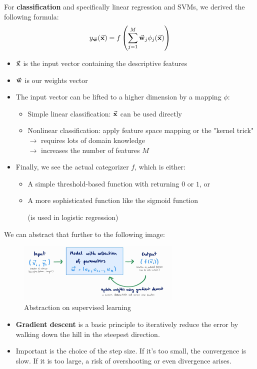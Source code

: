 For \textbf{classification} and specifically linear regression and SVMs, we derived the following formula:
\begin{align*}
  y_{\vec{\mathbf{w}}}(\vec{\mathbf{x}}) = f\left(\sum_{j=1}^M \vec{\mathbf{w}}_j\phi_j(\vec{\mathbf{x}}) \right)
\end{align*}
\begin{itemize}
  \item $\vec{\mathbf{x}}$ is the input vector containing the descriptive features
  \item $\vec{\mathbf{w}}$ is our weights vector
  \item The input vector can be lifted to a higher dimension by a mapping $\phi$:
  \begin{itemize}
    \item Simple linear classification: $\vec{\mathbf{x}}$ can be used directly
    \item Nonlinear classification: apply feature space mapping or the "kernel trick"\\$\rightarrow$ requires lots of domain knowledge\\$\rightarrow$ increases the number of features $M$
  \end{itemize}
  \item Finally, we see the actual categorizer $f$, which is either:
  \begin{itemize}
    \item A simple threshold-based function with returning $0$ or $1$, or
    \item A more sophisticated function like the sigmoid function \begin{note}(is used in logistic regression)\end{note}
  \end{itemize}
\end{itemize}

We can abstract that further to the following image:
\begin{figure}[H]
  \centering
  \includegraphics[width=0.7\textwidth]{assets/nn/in__supervised.png}
  \caption{Abstraction on supervised learning}
  \label{fig:6_intro_supervised}
\end{figure}
\begin{itemize}
  \item \textbf{Gradient descent} is a basic principle to iteratively reduce the error by walking down the hill in the steepest direction.
  \item Important is the choice of the step size. If it's too small, the convergence is slow. If it is too large, a risk of overshooting or even divergence arises.
\end{itemize}

